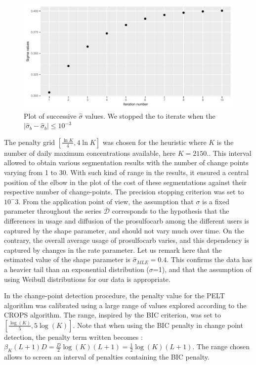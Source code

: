 \begin{figure}[ht]
  \centering
  \includegraphics[]{figs/Chap5/Sigma_heu.pdf}
  \caption{Plot of successive $\widehat{\sigma}$ values. We stopped the to iterate when the $\lvert \widehat{\sigma}_b - \widehat{\sigma}_{b} \rvert \leq 10^{-3}$}
  \label{fig:sig}
\end{figure}

The penalty grid $[\frac{\ln K}{4},4\ln K]$ was chosen for the heuristic where $K$ is the number of daily maximum concentrations available, here $K = 2150$.. This interval allowed to obtain various segmentation results with the number of change points varying from 1 to 30. With such kind of range in the results, it ensured a central position of the elbow in the plot of the cost of these segmentations against their respective number of change-points. The precision stopping criterion was set to $10^-3$.
From the application point of view, the assumption that $\sigma$ is a fixed parameter throughout the series $\overline{\mathcal{D}}$ corresponds to the hypothesis that the differences in usage and diffusion of the prosulfocarb among the different users is captured by the shape parameter, and should not vary much over time. On the contrary, the overall average usage of prosulfocarb varies, and this dependency is captured by changes in the rate parameter. Let us remark here that the estimated value of the shape parameter is $\hat \sigma_{MLE}=0.4$. This confirms the data has a heavier tail than an exponential distribution ($\sigma$=1), and that the assumption of using Weibull distributions for our data is appropriate. 


In the change-point detection procedure, the penalty value for the PELT algorithm was calibrated using a large range of values explored according to the CROPS algorithm. The range, inspired by the BIC criterion, was set to $[\frac{\log(K)}{5},5\log(K)]$. Note that when using the BIC penalty in change point detection, the penalty term written becomes : $\beta_K(L+1)D = \frac{D}{2}\log(K)(L+1) = \frac{1}{2}\log(K)(L+1)$. The range chosen allows to screen an interval of penalties containing the BIC penalty.

